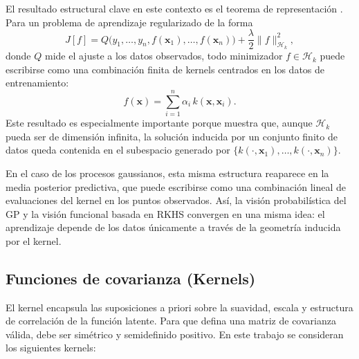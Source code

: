 El resultado estructural clave en este contexto es el teorema de representación \cite{scholkopf2001generalized}. Para un
problema de aprendizaje regularizado de la forma
\[
J[f]=Q\bigl(y_1,\dots,y_n,f(\bm{x}_1),\dots,f(\bm{x}_n)\bigr)
+\frac{\lambda}{2}\|f\|_{\mathcal{H}_k}^2,
\]
donde \(Q\) mide el ajuste a los datos observados, todo minimizador \(f\in
\mathcal{H}_k\) puede escribirse como una combinación finita de kernels centrados en los
datos de entrenamiento:
\[
f(\bm{x})=\sum_{i=1}^n \alpha_i\,k(\bm{x},\bm{x}_i).
\]
Este resultado es especialmente importante porque muestra que, aunque \(\mathcal{H}_k\)
pueda ser de dimensión infinita, la solución inducida por un conjunto finito de datos queda
contenida en el subespacio generado por
\(
\{k(\cdot,\bm{x}_1),\dots,k(\cdot,\bm{x}_n)\}.
\)

En el caso de los procesos gaussianos, esta misma estructura reaparece en la media posterior
predictiva, que puede escribirse como una combinación lineal de evaluaciones del kernel en
los puntos observados. Así, la visión probabilística del GP y la visión funcional basada en
RKHS convergen en una misma idea: el aprendizaje depende de los datos únicamente a
través de la geometría inducida por el kernel.

\subsection{Funciones de covarianza (Kernels)}
\label{subsec:gp_kernel}

El kernel encapsula las suposiciones a priori sobre la suavidad, escala y estructura de
correlación de la función latente. Para que defina una matriz de covarianza válida, debe ser
simétrico y semidefinido positivo. En este trabajo se consideran los siguientes kernels:

